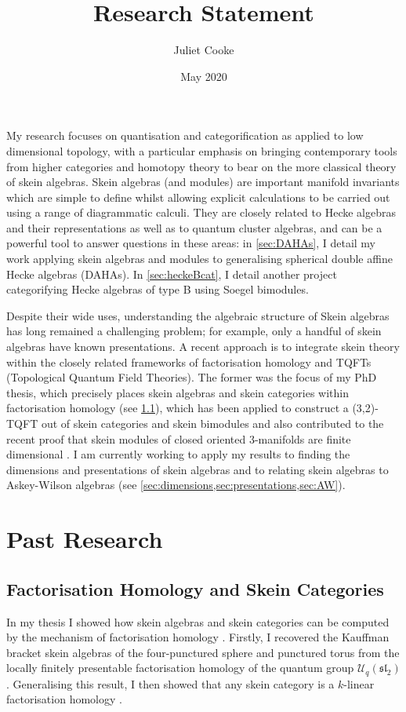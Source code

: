 \documentclass{article}
\title{Research Statement}
\author{Juliet Cooke}
\date{May 2020}
\newcommand{\slgroup}{\mathfrak{sl}}
\begin{document}
\maketitle

My research focuses on quantisation and categorification as applied to low dimensional topology, with a particular emphasis on bringing contemporary tools from higher categories and homotopy theory to bear on the more classical theory of skein algebras. Skein algebras (and modules) are important manifold invariants which are simple to define whilst allowing explicit calculations to be carried out using a range of diagrammatic calculi. They are closely related to Hecke algebras and their representations as well as to quantum cluster algebras, and can be a powerful tool to answer questions in these areas: in \cref{sec:DAHAs}, I detail my work applying skein algebras and modules to generalising spherical double affine Hecke algebras (DAHAs). In \cref{sec:heckeBcat}, I detail another project categorifying Hecke algebras of type B using Soegel bimodules.

Despite their wide uses, understanding the algebraic structure of Skein algebras has long remained a challenging problem; for example, only a handful of skein algebras have known presentations. A recent approach is to integrate skein theory within the closely related frameworks of factorisation homology and TQFTs (Topological Quantum Field Theories). The former was the focus of my PhD thesis, which precisely places skein algebras and skein categories within factorisation homology (see \cref{sec:skeincats}), which has been applied to construct a (3,2)-TQFT out of skein categories and skein bimodules \cite{JohnsonFreyd19} and also contributed to the recent proof that skein modules of closed oriented 3-manifolds are finite dimensional \cite{GJS19}. I am currently working to apply my results to finding the dimensions and presentations of skein algebras and to relating skein algebras to Askey-Wilson algebras (see \cref{sec:dimensions,sec:presentations,sec:AW}).

\section{Past Research}
\subsection{Factorisation Homology and Skein Categories}
\label{sec:skeincats}

In my thesis I showed how skein algebras and skein categories can be computed by the mechanism of factorisation homology \cite{CookeThesis}. Firstly, I recovered the Kauffman bracket skein algebras of the four-punctured sphere and punctured torus from the locally finitely presentable factorisation homology of the quantum group $\mathcal{U}_q(\slgroup_2)$ \cite{C1}. Generalising this result, I then showed that any skein category is a $k$-linear factorisation homology \cite{C2}.
\end{document}
